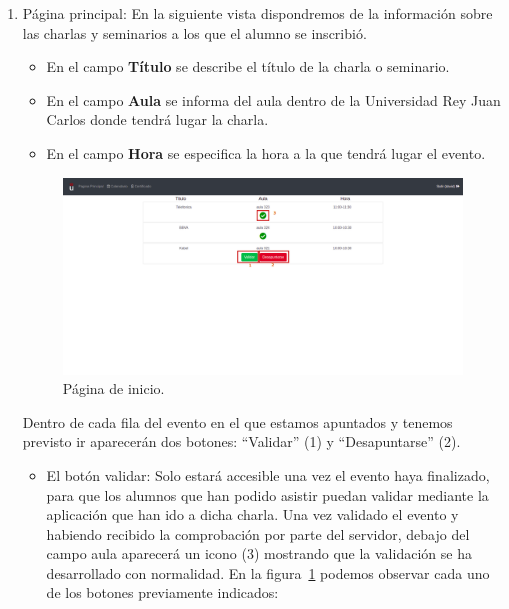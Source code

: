 \documentclass[a4paper, 12pt]{book}
\begin{document}
\begin{enumerate}
  \item Página principal: En la siguiente vista dispondremos de la información sobre las charlas y seminarios a los que el alumno se inscribió.
  \begin{itemize}
\item En el campo \textbf{Título} se describe el título de la charla o seminario.
\item En el campo \textbf{Aula} se informa del aula dentro de la Universidad Rey Juan Carlos donde tendrá lugar la charla.
\item En el campo \textbf{Hora} se especifica la hora a la que tendrá lugar el evento.
\end{itemize}
  
    \begin{figure}[h!]
  	\centering
  	\includegraphics[width=13cm, keepaspectratio]{img/inicio.png}
  	\caption{Página de inicio.}\label{fig:inicio}
	\end{figure}
	
  Dentro de cada fila del evento en el que estamos apuntados y tenemos previsto ir aparecerán dos botones: ``Validar'' (1) y ``Desapuntarse'' (2). 
\begin{itemize}
  \item El botón validar: Solo estará accesible una vez el evento haya finalizado, para que los alumnos que han podido asistir puedan validar mediante la aplicación que han ido a dicha charla. Una vez validado el evento y habiendo recibido la comprobación por parte del servidor, debajo del campo aula aparecerá un icono (3) mostrando que la validación se ha desarrollado con normalidad.
  En la figura~\ref{fig:inicio} podemos observar cada uno de los botones previamente indicados:



\end{itemize}
\end{enumerate}
\end{document}
